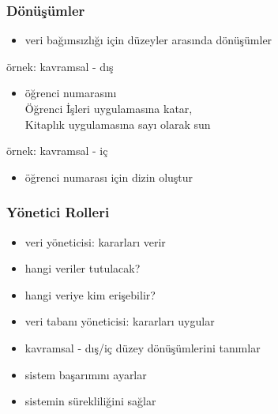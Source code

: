 \documentclass[dvipsnames]{beamer}
\theoremstyle{plain}
\begin{document}
\begin{frame}
  \frametitle{Dönüşümler}

  \begin{itemize}
    \item veri bağımsızlığı için düzeyler arasında dönüşümler
  \end{itemize}

  \medskip
  \begin{exampleblock}{örnek: kavramsal - dış}
    \begin{itemize}
      \item öğrenci numarasını\\
        Öğrenci İşleri uygulamasına katar,\\
        Kitaplık uygulamasına sayı olarak sun
    \end{itemize}
  \end{exampleblock}

  \pause
  \begin{exampleblock}{örnek: kavramsal - iç}
    \begin{itemize}
      \item öğrenci numarası için dizin oluştur
    \end{itemize}
  \end{exampleblock}
\end{frame}

%
%

\begin{frame}
  \frametitle{Yönetici Rolleri}

  \begin{itemize}
    \item veri yöneticisi: kararları verir
    \item hangi veriler tutulacak?
    \item hangi veriye kim erişebilir?
    

    \pause
    \bigskip
    \item veri tabanı yöneticisi: kararları uygular
    \item kavramsal - dış/iç düzey dönüşümlerini tanımlar
    \item sistem başarımını ayarlar
    \item sistemin sürekliliğini sağlar
  \end{itemize}
\end{frame}
\end{document}
